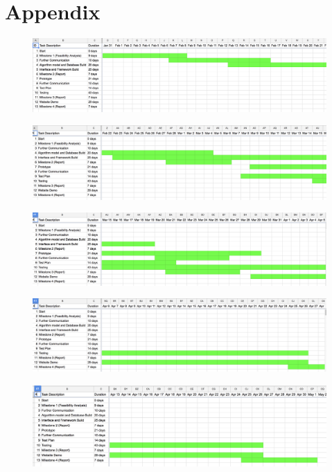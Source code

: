 \documentclass{article}
\begin{document}
\section{Appendix}
\begin{figure}[ht]
\includegraphics[scale=0.5,angle=270]{1.png}
\end{figure}

\hfill \break
\begin{figure}[ht]
\includegraphics[scale=0.5,angle=270]{2.png}
\end{figure}

\hfill \break
\begin{figure}[ht]
\includegraphics[scale=0.5,angle=270]{3.png}
\end{figure}

\hfill \break
\begin{figure}[ht]
\includegraphics[scale=0.5,angle=270]{4.png}
\end{figure}

\hfill \break
\begin{figure}[ht]
\includegraphics[scale=0.5,angle=270]{5.png}
\end{figure}
\end{document}
